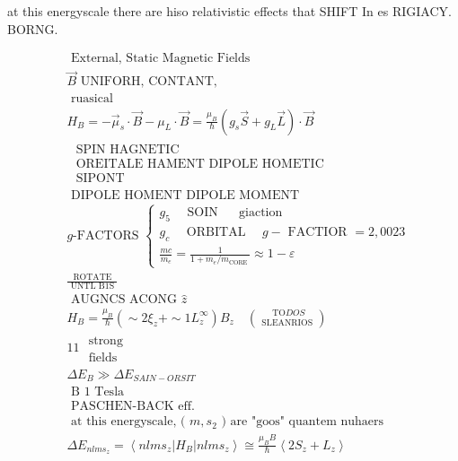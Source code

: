 at this energyscale there are hiso relativistic effects that SHIFT In es RIGIACY. BORNG.

$$
\begin{aligned}
& \text { External, Static Magnetic Fields } \\
& \vec{B} \text { UNIFORH, CONTANT, } \\
& \text { ruasical } \\
& H_{B}=-\vec{\mu}_{s} \cdot \vec{B}-\mu_{L} \cdot \vec{B}=\frac{\mu_{B}}{\hbar}\left(g_{s} \vec{S}+g_{L} \vec{L}\right) \cdot \vec{B} \\
& \begin{array}{l}
\text { SPIN HAGNETIC } \\
\text { OREITALE HAMENT DIPOLE HOMETIC } \\
\text { SIPONT }
\end{array} \\
& \text { DIPOLE HOMENT DIPOLE MOMENT } \\
& g \text {-FACTORS }\left\{\begin{array}{l}
g_{5} \quad \text { SOIN } \quad \text { giaction } \\
g_{c} \quad \text { ORBITAL } \quad g-\text { FACTIOR }=2,0023 \\
\frac{m c}{m_{e}}=\frac{1}{1+m_{e} / m_{\text {CORE }}} \approx 1-\varepsilon
\end{array}\right. \\
& \frac{\text { ROTATE }}{\text { UNTL B1S }} \\
& \text { AUGNCS ACONG } \hat{z} \\
& H_{B}=\frac{\mu_{B}}{\hbar}\left(\sim 2 \xi_{z}+\sim 1 L_{z}^{\infty}\right) B_{z} \quad\binom{\text { TO} D O S}{\text { SLEANRIOS }} \\
& 11 \begin{array}{c}
\text { strong } \\
\text { fields }
\end{array} \\
& \Delta E_{B} \gg \Delta E_{S A I N-O R S I T} \\
& \text { B~1 Tesla } \\
& \text { PASCHEN-BACK eff. } \\
& \text { at this energyscale, ( } m, s_{2} \text { ) are "goos" quantem nuhaers } \\
& \Delta E_{n l m s_{z}}=\left\langle n l m s_{z}\right| H_{B}\left|n l m s_{z}\right\rangle \cong \frac{\mu_{B} B}{\hbar}\left\langle 2 S_{z}+L_{z}\right\rangle
\end{aligned}
$$

